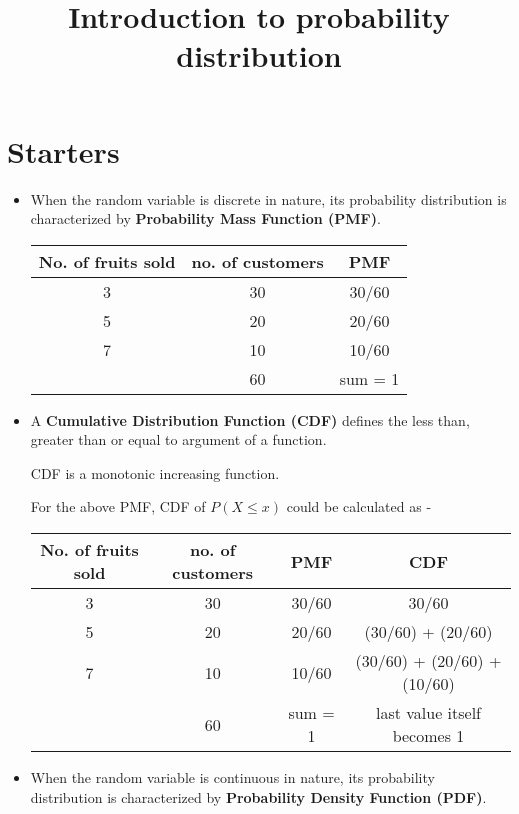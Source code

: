 \documentclass{article}
\begin{document}
\title{Introduction to probability distribution}

\maketitle


\section{Starters}
\begin{itemize}
	\item When  the random variable is discrete in nature, its probability distribution is characterized by \textbf{Probability Mass Function (PMF)}.
	\begin{center}
	\begin{tabular}{ |c|c|c| } 
 	\hline
 	\textbf{No. of fruits sold} & \textbf{no. of customers} & \textbf{PMF} \\ 
 	\hline
 	3 & 30 & 30/60 \\ 
 	5 & 20 & 20/60 \\ 
 	7 & 10 & 10/60 \\ 
 	\hline
 	  & 60 & sum = 1 \\ 
 	\hline
	\end{tabular}
	\end{center}
	\item A \textbf{Cumulative Distribution Function (CDF)} defines the less than, greater than or equal to argument of a function.
	
	CDF is a monotonic increasing function.
	
	For the above PMF, CDF of $P(X \le x)$ could be calculated as -
	\begin{center}
	\begin{tabular}{ |c|c|c|c| } 
 	\hline
 	 	\textbf{No. of fruits sold} & \textbf{no. of customers} & \textbf{PMF} & \textbf{CDF}\\ 
 	\hline
 	3 & 30 & 30/60 & 30/60\\ 
 	5 & 20 & 20/60 & (30/60) + (20/60)\\ 
 	7 & 10 & 10/60 & (30/60) + (20/60) + (10/60)\\ 
 	\hline
 	  & 60 & sum = 1 & last value itself becomes 1\\ 
 	\hline
	\end{tabular}
	\end{center}
	\item  When  the random variable is continuous in nature, its probability distribution is characterized by \textbf{Probability Density Function (PDF)}.

\end{itemize}
\end{document}

